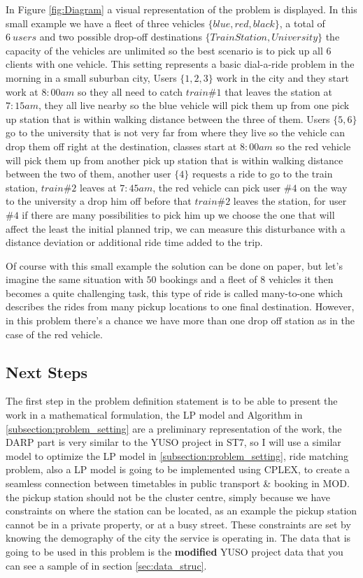 \documentclass{article}
\begin{document}
In Figure \ref{fig:Diagram} a visual representation of the problem is displayed. In this small example we have a fleet of three vehicles $\{blue,red,black\}$, a total of $6\ users$ and two possible drop-off destinations $\{Train Station, University\}$ the capacity of the vehicles are unlimited so the best scenario is to pick up all $6$ clients with one vehicle. This setting represents a basic dial-a-ride problem in the morning in a small suburban city, Users $\{1,2,3\}$ work in the city and they start work at $8:00am$ so they all need to catch $train \#1$ that leaves the station at $7:15am$, they all live nearby so the blue vehicle will pick them up from one pick up station that is within walking distance between the three of them. Users $\{5,6\}$ go to the university that is not very far from where they live so the vehicle can drop them off right at the destination, classes start at  $8:00am$ so the red vehicle will pick them up from another pick up station  that is within walking distance between the two of them, another user  $\{4\}$ requests a ride to go to the train station, $train \#2$ leaves at $7:45am$, the red vehicle can pick user $\#4 $ on the way to the university a drop him off before that
$train \#2$ leaves the station, for user $\#4 $ if there are many possibilities to pick him up we choose the one that will affect the least the initial planned trip, we can measure this disturbance with a distance deviation or additional ride time added to the trip.


Of course with this small example the solution can be done on paper, but let\rq{s} imagine the same situation with $50$ bookings and a fleet of $8$ vehicles it then becomes a quite challenging task, this type of ride is called many-to-one which describes the rides from many pickup locations to one final destination. However, in this problem there\rq{s} a chance we have more than one drop off station as in the case of the red vehicle.




\subsection{Next Steps}
\label{subsec:next_steps}
The first step in the problem definition statement is to be able to present the work in a mathematical formulation, the LP model and Algorithm in \ref{subsection:problem_setting}  are a preliminary representation of the work, the DARP part is very similar to the YUSO project in ST7, so I will use a similar model to optimize the LP model in \ref{subsection:problem_setting}, ride matching problem, also a LP model is going to be implemented using CPLEX, to create a seamless connection between timetables in public transport \& booking in MOD. the pickup station should not be the cluster centre, simply because we have constraints on where the station can be located, as an example the pickup station cannot be in a private property, or at a busy street.
These constraints are set by knowing the demography of the city the service is operating in. The data that is going to be used in this problem is the \textbf{modified} YUSO project data that you can see a sample of in section \ref{sec:data_struc}.
\end{document}
